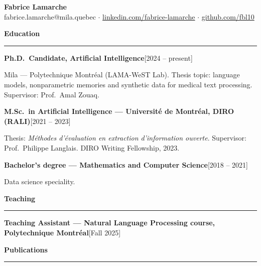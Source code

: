 \documentclass[10pt,a4paper]{article}
\newcommand{\cvsec}[1]{%
  \vspace{10pt}%
  {\noindent\large\bfseries #1\par}%
  \vspace{2pt}\hrule\vspace{7pt}%
}
\newcommand{\cventry}[2]{\noindent\textbf{#1}\hfill\textnormal{\small[#2]}\par}
\begin{document}
\begin{center}
    {\LARGE\bfseries Fabrice Lamarche}{\hspace{0.4em}{\normalsize\itshape (He/Him)}}\\[5pt]
    \small
    fabrice.lamarche@mila.quebec \; $\cdot$ \;
    \href{https://www.linkedin.com/in/fabrice-lamarche}{linkedin.com/fabrice-lamarche} \; $\cdot$ \;
    \href{https://github.com/fbl10}{github.com/fbl10}
\end{center}

\vspace{2pt}

\cvsec{Education}

\cventry{Ph.D.\ Candidate, Artificial Intelligence}{2024 -- present}
Mila --- Polytechnique Montr\'eal (LAMA-WeST Lab). Thesis topic: language models, nonparametric
memories and synthetic data for medical text processing. Supervisor: Prof.\ Amal Zouaq.

\vspace{2pt}
\cventry{M.Sc.\ in Artificial Intelligence --- Universit\'e de Montr\'eal, DIRO (RALI)}{2021 -- 2023}
Thesis: \emph{M\'ethodes d'\'evaluation en extraction d'information ouverte}. Supervisor:
Prof.\ Philippe Langlais. DIRO Writing Fellowship, 2023.

\vspace{2pt}
\cventry{Bachelor's degree --- Mathematics and Computer Science}{2018 -- 2021}
Data science speciality.

\cvsec{Teaching}

\cventry{Teaching Assistant --- Natural Language Processing course, Polytechnique
Montr\'eal}{Fall 2025}

\cvsec{Publications}
\end{document}

